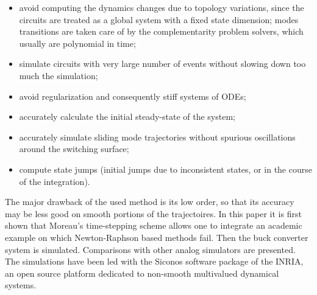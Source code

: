 \begin{itemize}

\item avoid computing the dynamics changes due to topology variations, since the circuits are treated as a global system with a fixed state dimension; modes transitions are taken care of by the complementarity problem solvers, which usually are polynomial in time;

\item simulate circuits with very large number of events without slowing down too much the simulation;

\item avoid regularization and consequently stiff systems of ODEs;

\item accurately calculate the initial steady-state of the system;

\item accurately simulate sliding mode trajectories without spurious oscillations around the switching surface;

\item compute state jumps (initial jumps due to inconsistent states, or in the course of the integration). 

\end{itemize}


The major drawback of the used method is its low order, so that its accuracy may be less good on smooth portions of the trajectoires. In this paper it is first shown that Moreau's time-stepping scheme allows one to integrate an academic example on which Newton-Raphson based methods fail. Then the buck converter system is simulated. Comparisons with other analog simulators are presented. The simulations have been led with the {\sc Siconos} software package of the INRIA, an open source platform dedicated to non-smooth multivalued dynamical systems. 




